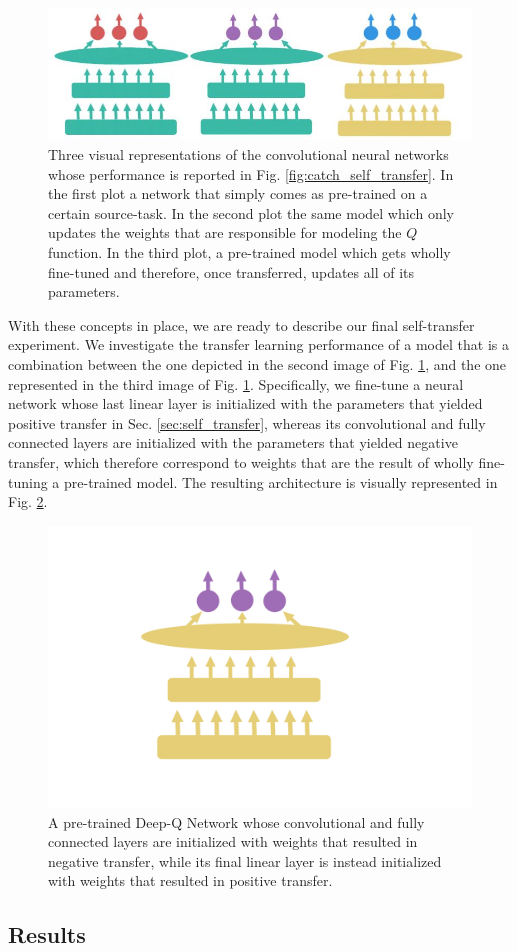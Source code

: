 \begin{figure}[ht!]
\centering
\includegraphics[width=\textwidth]{./Images/Chapter08/networks.jpg}
\caption{Three visual representations of the convolutional neural networks whose performance is reported in Fig. \ref{fig:catch_self_transfer}. In the first plot a network that simply comes as pre-trained on a certain source-task. In the second plot the same model which only updates the weights that are responsible for modeling the $Q$ function. In the third plot, a pre-trained model which gets wholly fine-tuned and therefore, once transferred, updates all of its parameters.}
\label{fig:networks}
\end{figure}

With these concepts in place, we are ready to describe our final self-transfer experiment. We investigate the transfer learning performance of a model that is a combination between the one depicted in the second image of Fig. \ref{fig:networks}, and the one represented in the third image of Fig. \ref{fig:networks}. Specifically, we fine-tune a neural network whose last linear layer is initialized with the parameters that yielded positive transfer in Sec. \ref{sec:self_transfer}, whereas its convolutional and fully connected layers are initialized with the parameters that yielded negative transfer, which therefore correspond to weights that are the result of wholly fine-tuning a pre-trained model. The resulting architecture is visually represented in Fig. \ref{fig:hybrid_network}.

\begin{figure}[ht!]
\centering
\includegraphics[width=\textwidth]{./Images/Chapter08/hybrid_network.pdf}
\caption{A pre-trained Deep-Q Network whose convolutional and fully connected layers are initialized with weights that resulted in negative transfer, while its final linear layer is instead initialized with weights that resulted in positive transfer.}
\label{fig:hybrid_network}
\end{figure}


\subsection{Results}




